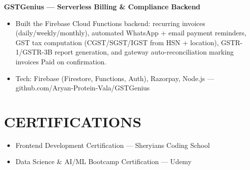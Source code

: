 \documentclass[9pt]{article}
\begin{document}
\textbf{GSTGenius  ---  Serverless Billing \& Compliance Backend}
\vspace{1pt}
\begin{itemize}[leftmargin=11pt,itemsep=0pt,topsep=1pt,parsep=0pt]
\item Built the Firebase Cloud Functions backend: recurring invoices (daily/weekly/monthly), automated WhatsApp + email payment reminders, GST tax computation (CGST/SGST/IGST from HSN + location), GSTR-1/GSTR-3B report generation, and gateway auto-reconciliation marking invoices Paid on confirmation.
\item Tech: Firebase (Firestore, Functions, Auth), Razorpay, Node.js  ---  github.com/Aryan-Protein-Vala/GSTGenius
\end{itemize}
\section*{CERTIFICATIONS}
\begin{itemize}[leftmargin=11pt,itemsep=0pt,topsep=1pt,parsep=0pt]
\item Frontend Development Certification  ---  Sheryians Coding School
\item Data Science \& AI/ML Bootcamp Certification  ---  Udemy
\end{itemize}
\end{document}
